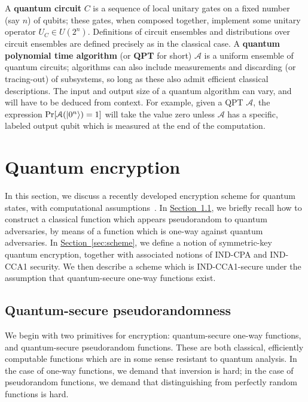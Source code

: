 \documentclass[envcountsame]{llncs}
\numberwithin{equation}{section}
\newcommand{\expref}[2]{\texorpdfstring{\hyperref[#2]{#1~\ref{#2}}}{#1~\ref{#2}}}
\begin{document}
A \textbf{quantum circuit} $C$ is a sequence of local unitary gates on a fixed number (say $n$) of qubits; these gates, when composed together, implement some unitary operator $U_C \in U(2^n)$. Definitions of circuit ensembles and distributions over circuit ensembles are defined precisely as in the classical case. A \textbf{quantum polynomial time algorithm} (or \textbf{QPT} for short) $\mathcal A$ is a uniform ensemble of quantum circuits; algorithms can also include measurements and discarding (or tracing-out) of subsystems, so long as these also admit efficient classical descriptions. The input and output size of a quantum algorithm can vary, and will have to be deduced from context. For example, given a QPT $\mathcal A$, the expression $\Pr[\mathcal A({\left\vert{0^n}\right\rangle}) = 1]$ will take the value zero unless $\mathcal A$ has a specific, labeled output qubit which is measured at the end of the computation.

\section{Quantum encryption}\label{sec:encryption}

In this section, we discuss a recently developed encryption scheme for quantum states, with computational assumptions~\cite{ABFGSS16}. In \expref{Section}{sec:pseudo}, we briefly recall how to construct a classical function which appears pseudorandom to quantum adversaries, by means of a function which is one-way against quantum adversaries. In \expref{Section}{sec:scheme}, we define a notion of symmetric-key quantum encryption, together with associated notions of IND-CPA and IND-CCA1 security. We then describe a scheme which is IND-CCA1-secure under the assumption that quantum-secure one-way functions exist. 

\subsection{Quantum-secure pseudorandomness}\label{sec:pseudo}

We begin with two primitives for encryption: quantum-secure one-way functions, and quantum-secure pseudorandom functions. These are both classical, efficiently computable functions which are in some sense resistant to quantum analysis. In the case of one-way functions, we demand that inversion is hard; in the case of pseudorandom functions, we demand that distinguishing from perfectly random functions is hard.
\end{document}
